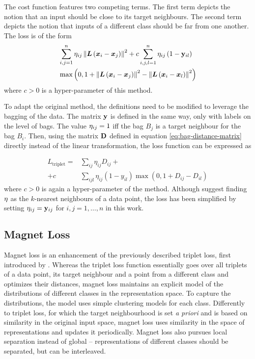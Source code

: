 The cost function features two competing terms. The first term depicts the notion that an input should be close to its target neighbours. The second term depicts the notion that inputs of a different class should be far from one another. The loss is of the form
\begin{align*}
	&\sum_{i, j = 1}^n \mathbf{\eta}_{ij} \left\lVert \bm{L} \left( \bm{x}_i - \bm{x}_j \right) \right\rVert^2 + c \sum_{i, j, l = 1}^n \mathbf{\eta}_{ij} \left( 1 - \mathbf{y}_{il} \right) \\
	&\max \left( 0, 1 + \left\lVert \bm{L} \left( \bm{x}_i - \bm{x}_j \right) \right\rVert^2 - \left\lVert \bm{L} \left( \bm{x}_i - \bm{x}_l \right) \right\rVert^2 \right)
\end{align*}
where \( c > 0 \) is a hyper-parameter of this method.

To adapt the original method, the definitions need to be modified to leverage the bagging of the data. The matrix \( \mathbf{y} \) is defined in the same way, only with labels on the level of bags. The value \( \mathbf{\eta}_{ij} = 1 \) iff the bag \( B_j \) is a target neighbour for the bag \( B_i \). Then, using the matrix \( \mathbf{D} \) defined in equation \ref{eq:bag-distance-matrix} directly instead of the linear transformation, the loss function can be expressed as

\begin{align*}
	L_\mathrm{triplet} = &\sum_{ij} \eta_{ij} D_{ij} + \\
	+ c &\sum_{ijl} \eta_{ij} \left( 1 - y_{il} \right) \max \left( 0, 1 + D_{ij} - D_{il} \right)
\end{align*}
where \( c > 0 \) is again a hyper-parameter of the method. Although \cite{weinberger_distance_2006} suggest finding \( \mathbf{\eta} \) as the \( k \)-nearest neighbours of a data point, the loss has been simplified by setting \( \mathbf{\eta}_{ij} = \mathbf{y}_{ij} \) for \( i, j = 1, \dots, n \) in this work.

\subsection{Magnet Loss}
Magnet loss is an enhancement of the previously described triplet loss, first introduced by \cite{rippel_metric_2015}. Whereas the triplet loss function essentially goes over all triplets of a data point, its target neighbour and a point from a different class and optimizes their distances, magnet loss maintains an explicit model of the distributions of different classes in the representation space. To capture the distributions, the model uses simple clustering models for each class. Differently to triplet loss, for which the target neighbourhood is set \textit{a priori} and is based on similarity in the original input space, magnet loss uses similarity in the space of representations and updates it periodically. Magnet loss also pursues local separation instead of global -- representations of different classes should be separated, but can be interleaved.

